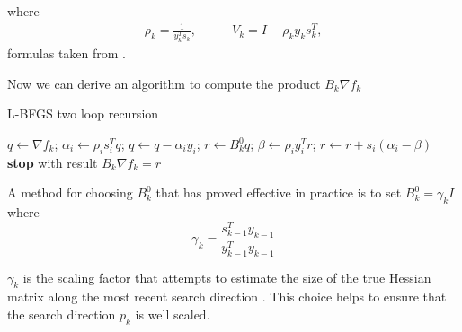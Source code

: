 where
\begin{align}
\rho_{k}= \frac{1}{y^T_{k}s_{k}}, & \qquad
V_{k} = I - \rho_{k} y_{k}s^T_{k},
\end{align}
formulas taken from \cite{numerical}.

Now we can derive an algorithm to compute the product $B_{k}\nabla f_{k}$

\begin{algorithm}[H]
	\caption{L-BFGS two loop recursion}
	\label{L-BFGSTwoLoop}
	\begin{algorithmic}[3]
	
		\State $q \gets \nabla f_{k}$;
        \State $ \alpha_{i} \gets \rho_{i}s^T_{i}q$;
        \State $q \gets q - \alpha_{i}y_{i}$; 
      \EndFor
 	  \State $r \gets B^0_{k}q$;
 	  \State $\beta \gets \rho_{i}y^T_{i}r$; 
 	  \State $r \gets r + s_{i}(\alpha_{i}-\beta)$
 	  \EndFor
	  \State \textbf{stop} with result $B_{k}\nabla f_{k}=r$
	\end{algorithmic}
\end{algorithm}


A method for choosing $B^0_{k}$ that has proved effective in practice is to set $B^0_{k}=\gamma_{k}I$  where 
\begin{equation}
\gamma_{k}= \frac{s^T_{k-1}y_{k-1}}{y^T_{k-1}y_{k-1}}
\end{equation}

$\gamma_{k}$ is the scaling factor that attempts to estimate the size of the true Hessian matrix along the most recent search direction \cite{numerical}. This choice helps to ensure that the search direction $p_{k}$ is well scaled.

